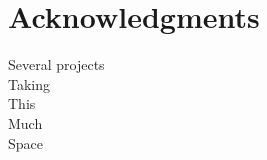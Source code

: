 \documentclass[runningheads,a4paper]{llncs}\usepackage[]{graphicx}\usepackage[]{color}
\begin{document}
\section*{Acknowledgments}


Several projects\\
Taking\\
This\\
Much\\
Space\\ 



\end{document}
